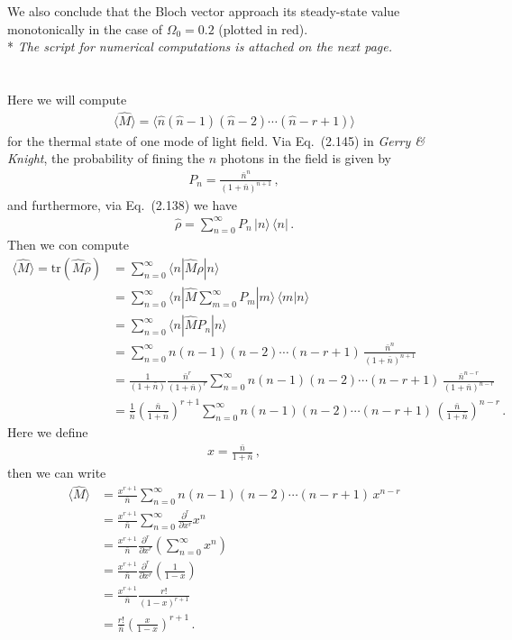 \documentclass[11pt, oneside]{book}
\theoremstyle{break}
\theoremstyle{break}
\newcommand{\pd}{\partial}
\begin{document}
We also conclude that the Bloch vector approach its steady-state
value monotonically in the case of $\Omega_0 = 0.2$ (plotted in red). \\

* \textit{The script for numerical computations is attached on the next page.}
\newpage
\lstset{style=mystyle}




\chapter{}
Here we will compute
\begin{align*}
\langle \hat{M}\rangle= \langle \hat{n}(\hat{n}-1)(\hat{n}-2)\cdots (\hat{n}-r+1)\rangle
\end{align*}
for the thermal state of one mode of light field. Via Eq.\ (2.145) in \textit{Gerry \& Knight}, the probability of fining the $n$ photons in the field is given by
\begin{align*}
P_n = \frac{\bar{n}^n}{(1 + \bar{n})^{n+1}}\,,
\end{align*}
and furthermore, via Eq.\ (2.138) we have
\begin{align*}
\hat{\rho} = \sum_{n=0}^\infty P_n \, |n\rangle\, \langle n|\,.
\end{align*}
Then we con compute
\begin{align*}
\langle \hat{M}\rangle  = 
\text{tr}(\hat{M}\hat{\rho}) 
&= \sum_{n=0}^\infty \langle n | \hat{M}\hat{\rho}|n\rangle\\
&= \sum_{n=0}^\infty \langle n | \hat{M} \sum_{m=0}^\infty P_m |m\rangle\, \langle m |n\rangle\\
&= \sum_{n=0}^\infty \langle n | \hat{M} P_n |n\rangle\, \\
&= \sum_{n=0}^\infty n(n-1)(n-2) \cdots (n-r+1)\, \frac{\bar{n}^n}{(1+\bar{n})^{n+1}} \, \\
&=\frac{1}{(1+\bar{n})} \frac{\bar{n}^r}{(1+\bar{n})^r}  \sum_{n=0}^\infty n(n-1)(n-2) \cdots (n-r+1)\, \frac{\bar{n}^{n-r}}{(1+\bar{n})^{n-r}} \, \\
&=\frac{1}{\bar{n}} \left(\frac{\bar{n}}{1+\bar{n}}\right)^{r+1}  \sum_{n=0}^\infty n(n-1)(n-2) \cdots (n-r+1)\, \left(\frac{\bar{n}}{1+\bar{n}}\right)^{n-r} \,.
\end{align*}
Here we define
\begin{align*}
x = \frac{\bar{n}}{1+\bar{n}}\,,
\end{align*}
then we can write
\begin{align*}
\langle \hat{M}\rangle 
&= 
\frac{x^{r+1}}{\bar{n}} 
\sum_{n=0}^\infty n(n-1)(n-2) \cdots (n-r+1)\, x^{n-r} \\
&= 
\frac{x^{r+1}}{\bar{n}} 
\sum_{n=0}^\infty \frac{\pd^r}{\pd x^r}x^{n} \\
&= 
\frac{x^{r+1}}{\bar{n}}
\frac{\pd^r}{\pd x^r}\left( 
\sum_{n=0}^\infty x^{n}\right) \\
&= 
\frac{x^{r+1}}{\bar{n}}
\frac{\pd^r}{\pd x^r} \left(
\frac{1}{1-x} \right)\\
&= 
\frac{x^{r+1}}{\bar{n}}
\frac{r!}{(1-x)^{r+1}}
\\
&= 
\frac{r!}{\bar{n}}
\left(\frac{x}{1-x}\right)^{r+1}
\,.
\end{align*}
\end{document}
